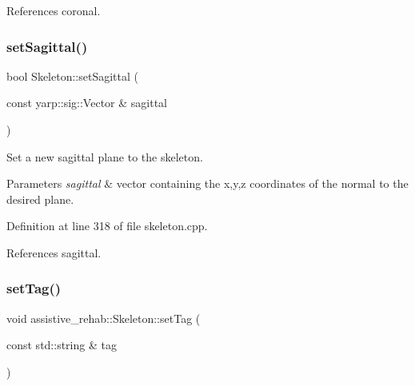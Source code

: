 References coronal.

\mbox{\label{classassistive__rehab_1_1Skeleton_af92fdb0e3eb88a0b1dedd5038e2c6eb7}} 
\subsubsection{\texorpdfstring{setSagittal()}{setSagittal()}}
{\footnotesize\ttfamily bool Skeleton\+::set\+Sagittal (\begin{DoxyParamCaption}\item[{const yarp\+::sig\+::\+Vector \&}]{sagittal }\end{DoxyParamCaption})}



Set a new sagittal plane to the skeleton. 


\begin{DoxyParams}{Parameters}
{\em sagittal} & vector containing the x,y,z coordinates of the normal to the desired plane. \\
\hline
\end{DoxyParams}


Definition at line 318 of file skeleton.\+cpp.


\begin{DoxyCode}{0}

\end{DoxyCode}


References sagittal.

\mbox{\label{classassistive__rehab_1_1Skeleton_ae1c830e3d9a0ba692e5ae297caa52a82}} 
\subsubsection{\texorpdfstring{setTag()}{setTag()}}
{\footnotesize\ttfamily void assistive\+\_\+rehab\+::\+Skeleton\+::set\+Tag (\begin{DoxyParamCaption}\item[{const std\+::string \&}]{tag }\end{DoxyParamCaption})\hspace{0.3cm}{\ttfamily [inline]}}



